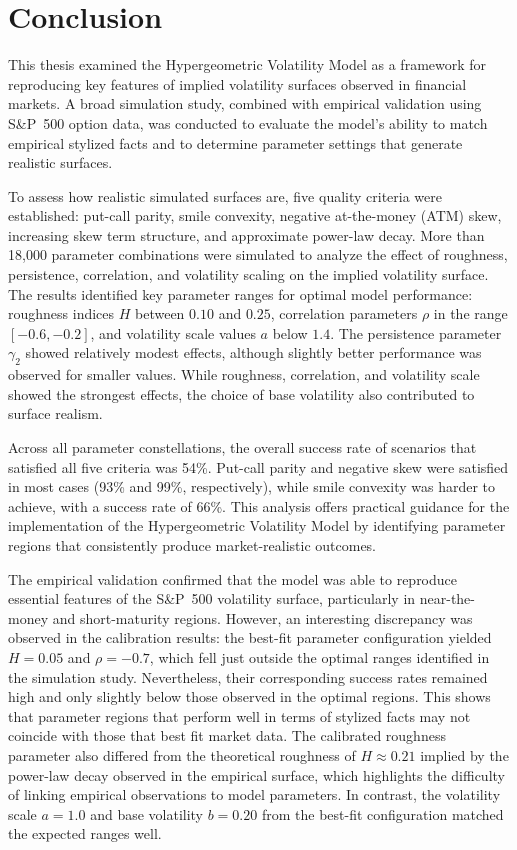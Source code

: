 \section{Conclusion} \label{sec:Conclusion}

This thesis examined the Hypergeometric Volatility Model as a framework for reproducing key features of implied volatility surfaces observed in financial markets. A broad simulation study, combined with empirical validation using S\&P~500 option data, was conducted to evaluate the model's ability to match empirical stylized facts and to determine parameter settings that generate realistic surfaces.

To assess how realistic simulated surfaces are, five quality criteria were established: put-call parity, smile convexity, negative at-the-money (ATM) skew, increasing skew term structure, and approximate power-law decay. More than 18{,}000 parameter combinations were simulated to analyze the effect of roughness, persistence, correlation, and volatility scaling on the implied volatility surface. The results identified key parameter ranges for optimal model performance: roughness indices $H$ between $0.10$ and $0.25$, correlation parameters $\rho$ in the range $[-0.6, -0.2]$, and volatility scale values $a$ below $1.4$. The persistence parameter $\gamma_2$ showed relatively modest effects, although slightly better performance was observed for smaller values. While roughness, correlation, and volatility scale showed the strongest effects, the choice of base volatility also contributed to surface realism.

Across all parameter constellations, the overall success rate of scenarios that satisfied all five criteria was 54\%. Put-call parity and negative skew were satisfied in most cases (93\% and 99\%, respectively), while smile convexity was harder to achieve, with a success rate of 66\%. This analysis offers practical guidance for the implementation of the Hypergeometric Volatility Model by identifying parameter regions that consistently produce market-realistic outcomes.

The empirical validation confirmed that the model was able to reproduce essential features of the S\&P~500 volatility surface, particularly in near-the-money and short-maturity regions. However, an interesting discrepancy was observed in the calibration results: the best-fit parameter configuration yielded $H = 0.05$ and $\rho = -0.7$, which fell just outside the optimal ranges identified in the simulation study. Nevertheless, their corresponding success rates remained high and only slightly below those observed in the optimal regions. This shows that parameter regions that perform well in terms of stylized facts may not coincide with those that best fit market data. The calibrated roughness parameter also differed from the theoretical roughness of $H \approx 0.21$ implied by the power-law decay observed in the empirical surface, which highlights the difficulty of linking empirical observations to model parameters. In contrast, the volatility scale $a = 1.0$ and base volatility $b = 0.20$ from the best-fit configuration matched the expected ranges well.

